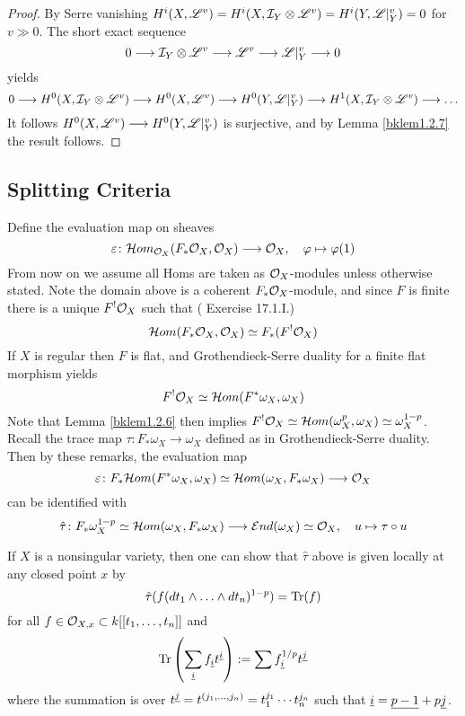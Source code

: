 \documentclass[12pt]{article}
\begin{document}
\begin{proof}
    By Serre vanishing $H^i(X, \mathscr{L}^v) = H^i(X, \mathcal{I}_Y \otimes \mathscr{L}^v) = H^i(Y, \mathscr{L}\vert_Y^v) = 0$ for $v \gg 0$. The short exact sequence
    \[0 \longrightarrow \mathcal{I}_Y \otimes \mathscr{L}^v \longrightarrow \mathscr{L}^v \longrightarrow \mathscr{L}\vert_Y^v \longrightarrow 0 \]
    yields
    \[0 \longrightarrow H^0(X, \mathcal{I}_Y \otimes \mathscr{L}^v) \longrightarrow H^0(X, \mathscr{L}^v) \longrightarrow H^0(Y, \mathscr{L}\vert_Y^v) \longrightarrow H^1(X, \mathcal{I}_Y \otimes \mathscr{L}^v) \longrightarrow \ldots\]
    It follows $H^0(X, \mathscr{L}^v) \longrightarrow H^0(Y, \mathscr{L}\vert_Y^v)$ is surjective, and by Lemma \ref{bklem1.2.7} the result follows.
\end{proof}
\subsection{Splitting Criteria}
Define the evaluation map on sheaves
\[\varepsilon \colon \mathcal{H} om_{\mathcal{O}_X}(F_* \mathcal{O}_X, \mathcal{O}_X) \longrightarrow \mathcal{O}_X, \quad \varphi \mapsto \varphi(1)\]
From now on we assume all Homs are taken as $\mathcal{O}_X$-modules unless otherwise stated. Note the domain above is a coherent $F_* \mathcal{O}_X$-module, and since $F$ is finite there is a unique $F^! \mathcal{O}_X$ such that (\cite{vakil2025} Exercise 17.1.I.)
\[\mathcal{H} om(F_* \mathcal{O}_X, \mathcal{O}_X) \simeq F_*(F^! \mathcal{O}_X)\]
If $X$ is regular then $F$ is flat, and Grothendieck-Serre duality for a finite flat morphism yields
\[F^! \mathcal{O}_X \simeq \mathcal{H} om(F^* \omega_X, \omega_X)\]
Note that Lemma \ref{bklem1.2.6} then implies $F^! \mathcal{O}_X \simeq \mathcal{H} om(\omega_X^p, \omega_X) \simeq \omega_X^{1-p}$. Recall the trace map $\tau \colon F_* \omega_X \to \omega_X$ defined as in Grothendieck-Serre duality. Then by these remarks, the evaluation map
\[\varepsilon \colon F_* \mathcal{H} om(F^* \omega_X, \omega_X) \simeq \mathcal{H} om(\omega_X, F_* \omega_X) \longrightarrow \mathcal{O}_X\]
can be identified with
\[\hat{\tau} \colon F_* \omega_X^{1-p} \simeq \mathcal{H} om(\omega_X, F_* \omega_X) \longrightarrow \mathcal{E} nd(\omega_X) \simeq \mathcal{O}_X, \quad u \mapsto \tau \circ u\]
\begin{rem}If $X$ is a nonsingular variety, then one can show that $\hat{\tau}$ above is given locally at any closed point $x$ by
\[\hat{\tau}(f(dt_1 \wedge \ldots \wedge dt_n)^{1-p}) = \operatorname{Tr}(f)\]
for all $f \in \mathcal{O}_{X,x} \subset k[[t_1,\ldots,t_n]]$ and 
\[\operatorname{Tr}\left(\sum_{\underline{i}}f_{\underline{i}} t^{\underline i}\right) := \sum f_{\underline{i}}^{1/p} t^{\underline{j}}\] 
where the summation is over $t^{\underline j} = t^{(j_1,\ldots,j_n)} = t_1^{j_1} \cdots t_n^{j_n}$ such that $\underline i = \underline{p-1} + p \underline j$.
\end{rem}
\end{document}
